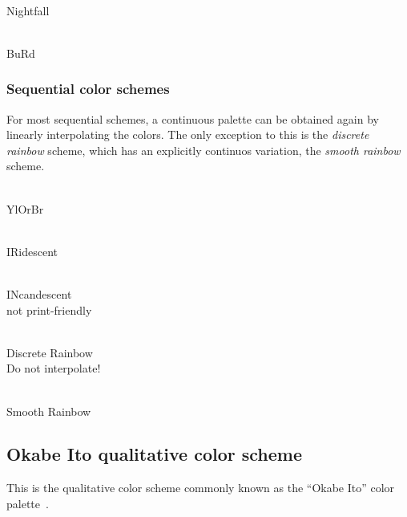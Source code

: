 \documentclass{scrartcl}
\begin{document}
\begin{center}
    \\
    Nightfall
\end{center}

\begin{center}
    \\
    BuRd
\end{center}

\subsubsection{Sequential color schemes}\label{sec:T-S}
For most sequential schemes, a continuous palette can be obtained again by linearly interpolating the colors.
The only exception to this is the \emph{discrete rainbow} scheme, which has an explicitly continuos variation, the \emph{smooth rainbow} scheme.%

\begin{center}
    \\
    YlOrBr
\end{center}

\begin{center}
    \\
    IRidescent
\end{center}

\begin{center}
    \\
    INcandescent\\
    not print-friendly
\end{center}

\begin{center}
    \\
    Discrete Rainbow\\
    Do not interpolate!
\end{center}

\begin{center}
    \\
    Smooth Rainbow\\
\end{center}

\subsection{Okabe Ito qualitative color scheme}\label{sec:OkabeIto}
This is the qualitative color scheme commonly known as the ``Okabe Ito'' color palette~\cite{Ichihara_2008}.
\end{document}
